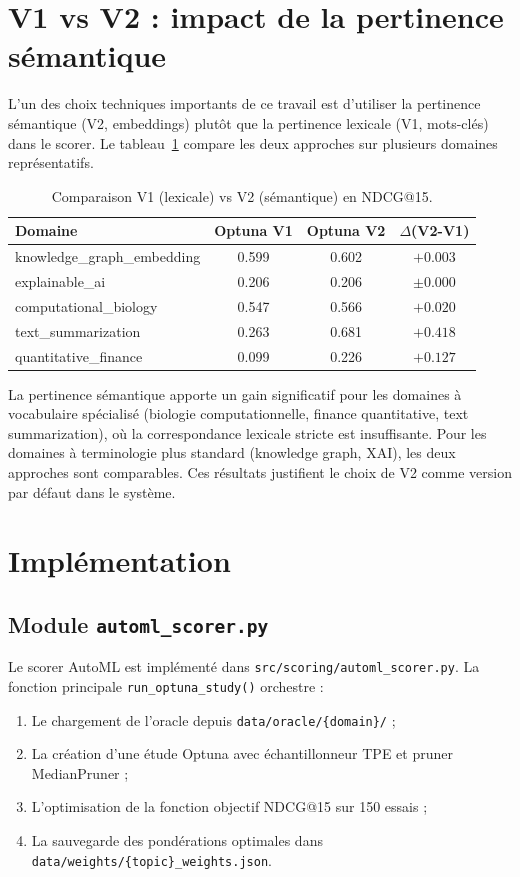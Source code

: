 \section{V1 vs V2 : impact de la pertinence sémantique}

L'un des choix techniques importants de ce travail est d'utiliser la
pertinence sémantique (V2, embeddings) plutôt que la pertinence lexicale
(V1, mots-clés) dans le scorer. Le tableau~\ref{tab:v1_v2} compare
les deux approches sur plusieurs domaines représentatifs.

\begin{table}[htbp]
  \centering
  \caption{Comparaison V1 (lexicale) vs V2 (sémantique) en NDCG@15.}
  \label{tab:v1_v2}
  \begin{tabular}{lccc}
    \toprule
    \textbf{Domaine} & \textbf{Optuna V1} & \textbf{Optuna V2} & \textbf{$\Delta$(V2-V1)} \\
    \midrule
    knowledge\_graph\_embedding & 0.599 & 0.602 & $+0.003$ \\
    explainable\_ai & 0.206 & 0.206 & $\pm 0.000$ \\
    computational\_biology & 0.547 & 0.566 & $+0.020$ \\
    text\_summarization & 0.263 & 0.681 & $+0.418$ \\
    quantitative\_finance & 0.099 & 0.226 & $+0.127$ \\
    \bottomrule
  \end{tabular}
\end{table}

La pertinence sémantique apporte un gain significatif pour les domaines
à vocabulaire spécialisé (biologie computationnelle, finance quantitative,
text summarization), où la correspondance lexicale stricte est insuffisante.
Pour les domaines à terminologie plus standard (knowledge graph, XAI),
les deux approches sont comparables. Ces résultats justifient le choix
de V2 comme version par défaut dans le système.

\section{Implémentation}

\subsection{Module \texttt{automl\_scorer.py}}

Le scorer AutoML est implémenté dans \texttt{src/scoring/automl\_scorer.py}.
La fonction principale \texttt{run\_optuna\_study()} orchestre :
\begin{enumerate}
  \item Le chargement de l'oracle depuis \texttt{data/oracle/\{domain\}/} ;
  \item La création d'une étude Optuna avec échantillonneur TPE et
    pruner MedianPruner ;
  \item L'optimisation de la fonction objectif NDCG@15 sur 150 essais ;
  \item La sauvegarde des pondérations optimales dans
    \texttt{data/weights/\{topic\}\_weights.json}.
\end{enumerate}

